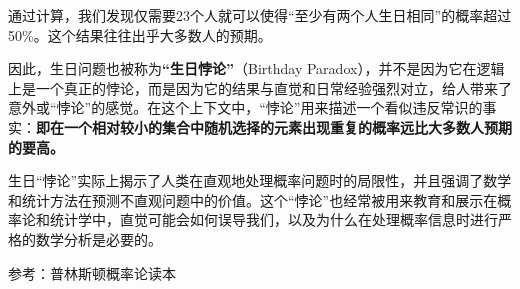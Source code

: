 通过计算，我们发现仅需要23个人就可以使得“至少有两个人生日相同”的概率超过50\%。这个结果往往出乎大多数人的预期。

因此，生日问题也被称为\textbf{“生日悖论”}（Birthday Paradox），并不是因为它在逻辑上是一个真正的悖论，而是因为它的结果与直觉和日常经验强烈对立，给人带来了意外或“悖论”的感觉。在这个上下文中，“悖论”用来描述一个看似违反常识的事实：\textbf{即在一个相对较小的集合中随机选择的元素出现重复的概率远比大多数人预期的要高。}

生日“悖论”实际上揭示了人类在直观地处理概率问题时的局限性，并且强调了数学和统计方法在预测不直观问题中的价值。这个“悖论”也经常被用来教育和展示在概率论和统计学中，直觉可能会如何误导我们，以及为什么在处理概率信息时进行严格的数学分析是必要的。

参考：普林斯顿概率论读本